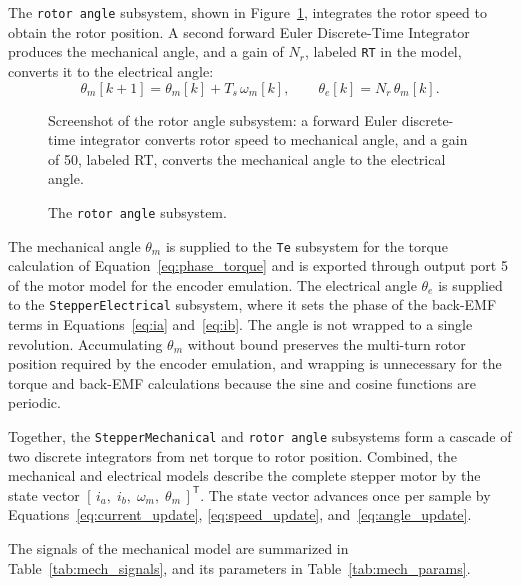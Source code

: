 The \texttt{rotor angle} subsystem, shown in Figure~\ref{fig:rotor_angle}, %
integrates the rotor speed to obtain the rotor position. A second forward Euler Discrete-Time Integrator produces the mechanical angle, and a gain of $N_r$, labeled \texttt{RT} in the model, converts it to the electrical angle:
\begin{equation}
	\theta_m[k+1] = \theta_m[k] + T_s\,\omega_m[k], \qquad
	\theta_e[k] = N_r\,\theta_m[k].
	\label{eq:angle_update}
\end{equation}

\begin{figure}[htbp]
	\centering
		{Screenshot of the rotor angle subsystem: a forward Euler discrete-time integrator converts rotor speed to mechanical angle, and a gain of 50, labeled RT, converts the mechanical angle to the electrical angle.}
	\caption[The rotor angle subsystem]{The \texttt{rotor angle} subsystem.}
	\label{fig:rotor_angle}
\end{figure}


The mechanical angle $\theta_m$ is supplied to the \texttt{Te} subsystem for the torque calculation of Equation~\eqref{eq:phase_torque} and is exported through output port 5 of the motor model for the encoder emulation. The electrical angle $\theta_e$ is supplied to the \texttt{StepperElectrical} subsystem, where it sets the phase of the back-EMF terms in Equations~\eqref{eq:ia} and~\eqref{eq:ib}. The angle is not wrapped to a single revolution. Accumulating $\theta_m$ without bound preserves the multi-turn rotor position required by the encoder emulation, and wrapping is unnecessary for the torque and back-EMF calculations because the sine and cosine functions are periodic.

Together, the \texttt{StepperMechanical} and \texttt{rotor angle} subsystems form a cascade of two discrete integrators from net torque to rotor position. Combined, the mechanical and electrical models describe the complete stepper motor by the state vector $\left[\, i_a,\; i_b,\; \omega_m,\; \theta_m \,\right]^{\mathsf{T}}$. The state vector advances once per sample by Equations~\eqref{eq:current_update}, \eqref{eq:speed_update}, and~\eqref{eq:angle_update}.


 The signals of the mechanical model are summarized in Table~\ref{tab:mech_signals}, and its parameters in Table~\ref{tab:mech_params}.

